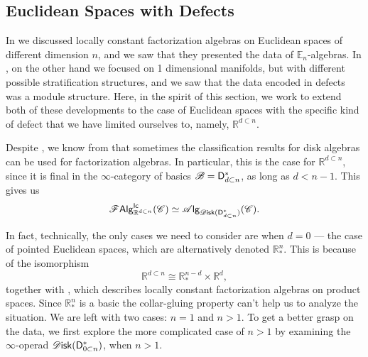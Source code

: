 \documentclass[../text.tex]{subfiles}
\begin{document}
\subsection{Euclidean Spaces with Defects}


In  we discussed locally constant factorization algebras on Euclidean spaces of different dimension $n$, and we saw that they presented the data of $\mathbb{E}_n$-algebras. In , on the other hand we focused on 1 dimensional manifolds, but with different possible stratification structures, and we saw that the data encoded in defects was a module structure. Here, in the spirit of this section, we work to extend both of these developments to the case of Euclidean spaces with the specific kind of defect that we have limited ourselves to, namely, $\mathbb{R}^{d \subset n}$.

Despite , we know from  that sometimes the classification results for disk algebras can be used for factorization algebras. In particular, this is the case for $\mathbb{R}^{d \subset n}$, since it is final in the $\infty$-category of basics $\mathscr{B} = \mathsf{D}_{d \subset n}^*$, as long as $d < n - 1$. This gives us
%
\begin{equation}\label{eq:focus_on_disk_dn}
    \lcfa_{\mathbb{R}^{d \subset n}} (\catC) \simeq \alg{\disk (\mathsf{D}_{d \subset n}^*)} (\catC).
\end{equation}

In fact, technically, the only cases we need to consider are when $d=0$ --- the case of pointed Euclidean spaces, which are alternatively denoted $\mathbb{R}^n_*$. This is because of the isomorphism
%
\begin{equation}
    \mathbb{R}^{d \subset n} \cong \mathbb{R}^{n-d}_* \times \mathbb{R}^d,
\end{equation}
%
together with , which describes locally constant factorization algebras on product spaces. Since $\mathbb{R}^n_*$ is a basic the collar-gluing property  can't help us to analyze the situation. We are left with two cases: $n=1$ and $n > 1$. To get a better grasp on the data, we first explore the more complicated case of $n > 1$ by examining the $\infty$-operad $\disk(\mathsf{D}_{0 \subset n}^*)$, when $n > 1$. 
\end{document}
